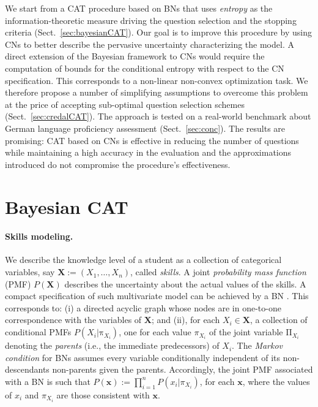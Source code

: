 \documentclass[runningheads]{llncs}
\begin{document}
	We start from a CAT procedure based on BNs that uses \emph{entropy} as the 
	information-theoretic measure driving the question selection and the stopping criteria 
	(Sect.~\ref{sec:bayesianCAT}). Our goal is to improve  this procedure by using CNs to 
	better describe the pervasive uncertainty characterizing the model. A direct extension 
	of the Bayesian framework to CNs would require the computation of bounds for the 
	conditional entropy with respect to the CN specification. This corresponds to a 
	non-linear non-convex optimization task. We therefore propose a number of 
	simplifying assumptions to overcome this problem at the price of accepting 
	sub-optimal question selection schemes (Sect.~\ref{sec:credalCAT}). The approach is 
	tested on a real-world benchmark about German language proficiency assessment 
	(Sect.~\ref{sec:conc}). The results are promising: CAT based on CNs is effective in 
	reducing the number of questions while maintaining a high accuracy in the evaluation 
	and the approximations introduced do not compromise the procedure's effectiveness.
	
	\section{Bayesian CAT}
	
	\paragraph{Skills modeling.} We describe the knowledge level of a student as a 
	collection of categorical variables, say $\bm{X}:=(X_1,\ldots,X_n)$, called \emph{skills}. 
	A joint \emph{probability mass function} (PMF) $P(\bm{X})$ describes the uncertainty 
	about the actual values of the skills. A compact specification of such multivariate model 
	can be achieved by a BN \cite{koller2009}. This corresponds to: (i) a directed acyclic 
	graph whose nodes are in one-to-one correspondence with the variables of $\bm{X}$; 
	and (ii), for each $X_i\in\bm{X}$, 
	a collection of conditional PMFs $P(X_i|\mathrm{\pi}_{X_i})$, one for each value 
	$\pi_{X_i}$ of the joint variable $\mathrm{\Pi}_{X_i}$ denoting the \emph{parents} (i.e., 
	the immediate predecessors) of $X_i$. The \emph{Markov condition} for BNs assumes 
	every variable conditionally independent of its non-descendants non-parents given the 
	parents. Accordingly, the joint PMF associated with a BN is such that $P(\bm{x}):= 
	\prod_{i=1}^n P(x_i|\pi_{X_i})$, for each $\bm{x}$, where the values of $x_i$ and 
	$\pi_{X_i}$ are those consistent with $\bm{x}$. 
	
\end{document}
